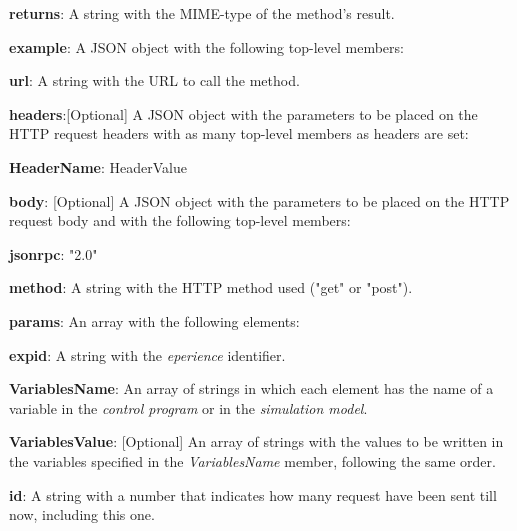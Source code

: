 \begin{myEnumerate}
\begin{myEnumerate}
\begin{myEnumerate}
\begin{myEnumerate}
            \end{myEnumerate}
            \item \textbf{returns}: A string with the MIME-type of the method's result.
            \item \textbf{example}: A JSON object with the following top-level members:
            \begin{myEnumerate}
                    \item \textbf{url}: A string with the URL to call the method.
                    \item \textbf{headers}:[Optional] A JSON object with the parameters to be placed on the HTTP request headers with as many top-level members as headers are set:
                    \begin{myEnumerate}
                        \item \textbf{HeaderName}: HeaderValue
                    \end{myEnumerate}
                    \item \textbf{body}: [Optional] A JSON object with the parameters to be placed on the HTTP request body and with the following top-level members:
                    \begin{myEnumerate}
                        \item \textbf{jsonrpc}: "2.0"
                        \item \textbf{method}: A string with the HTTP method used ("get" or "post").
                        \item \textbf{params}: An array with the following elements:
                        \begin{myEnumerate}
                            \item \textbf{expid}: A string with the \textit{eperience} identifier.
                            \item \textbf{VariablesName}: An array of strings in which each element has the name of a variable in the \textit{control program} or in the \textit{simulation model}.
                            \item \textbf{VariablesValue}: [Optional] An array of strings with the values to be written in the variables specified in the \textit{VariablesName} member, following the same order.
                        \end{myEnumerate}
                        \item \textbf{id}: A string with a number that indicates how many request have been sent till now, including this one.

\end{myEnumerate}
\end{myEnumerate}
\end{myEnumerate}
\end{myEnumerate}
\end{myEnumerate}

